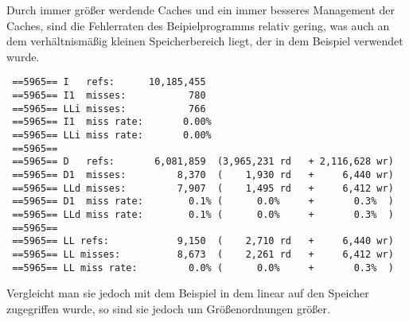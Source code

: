  Durch immer größer werdende Caches und ein immer besseres Management der Caches, sind die Fehlerraten des Beipielprogramms relativ gering, was auch an dem verhältnismäßig kleinen Speicherbereich liegt, der in dem Beispiel verwendet wurde.
 
 \begin{singlespace}
 \begin{scriptsize}
 \begin{lstlisting}
 ==5965== I   refs:      10,185,455
 ==5965== I1  misses:           780
 ==5965== LLi misses:           766
 ==5965== I1  miss rate:       0.00%
 ==5965== LLi miss rate:       0.00%
 ==5965== 
 ==5965== D   refs:       6,081,859  (3,965,231 rd   + 2,116,628 wr)
 ==5965== D1  misses:         8,370  (    1,930 rd   +     6,440 wr)
 ==5965== LLd misses:         7,907  (    1,495 rd   +     6,412 wr)
 ==5965== D1  miss rate:        0.1% (      0.0%     +       0.3%  )
 ==5965== LLd miss rate:        0.1% (      0.0%     +       0.3%  )
 ==5965== 
 ==5965== LL refs:            9,150  (    2,710 rd   +     6,440 wr)
 ==5965== LL misses:          8,673  (    2,261 rd   +     6,412 wr)
 ==5965== LL miss rate:         0.0% (      0.0%     +       0.3%  )
 \end{lstlisting}
 \end{scriptsize}
 \end{singlespace}
 
 Vergleicht man sie jedoch mit dem Beispiel in dem linear auf den Speicher zugegriffen wurde, so sind sie jedoch um Größenordnungen größer.